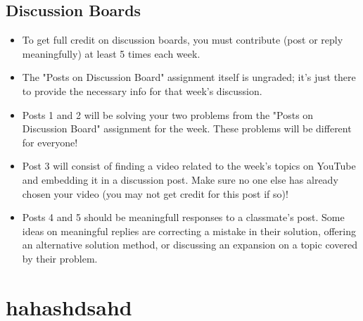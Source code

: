 \documentclass[11pt]{exam}
\begin{document}
    \subsection{Discussion Boards}
    \begin{itemize}
        \item To get full credit on discussion boards, you must contribute (post or reply meaningfully) at least 5 times each week.
        \item The "Posts on Discussion Board" assignment itself is ungraded; it's just there to provide the necessary info for that week's discussion.
        \item Posts 1 and 2 will be solving your two problems from the "Posts on Discussion Board" assignment for the week. These problems will be 
        different for everyone!
        \item Post 3 will consist of finding a video related to the week's topics on YouTube and embedding it in a discussion post. Make sure no one else
        has already chosen your video (you may not get credit for this post if so)!
        \item Posts 4 and 5 should be meaningfull responses to a classmate's post. Some ideas on meaningful replies are correcting a mistake in their
        solution, offering an alternative solution method, or discussing an expansion on a topic covered by their problem.
    \end{itemize}
\pagebreak
    
\vspace{10px}
\section{hahashdsahd}
\end{document}
